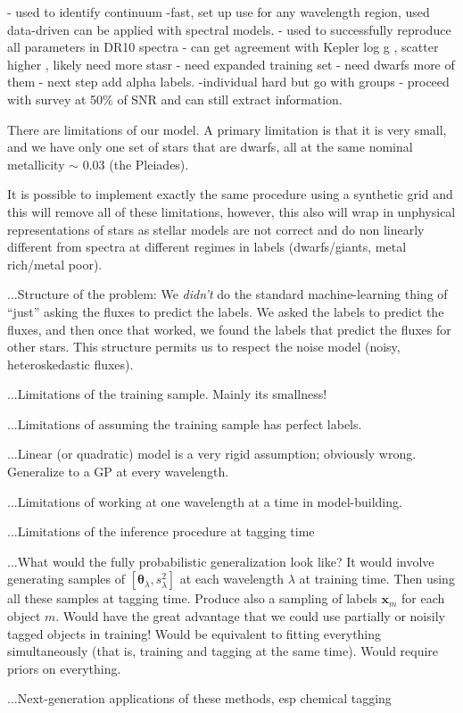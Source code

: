 \documentclass[12pt, preprint]{aastex}
\newcommand{\set}[1]{\bm{#1}}
\begin{document}
- used to identify continuum
-fast, set up use for any wavelength region, used data-driven can be applied with spectral models. 
- used to successfully reproduce all parameters in DR10 spectra
- can get agreement with Kepler log g , scatter higher , likely need more stasr
- need expanded training set - need dwarfs more of them
- next step add alpha labels. 
-individual hard but go with groups
- proceed with survey at 50\% of SNR and can still extract information.

There are limitations of our model. A primary limitation is that it is very small, and we have only one set of stars that are dwarfs, all at the same nominal metallicity $\sim$ 0.03 (the Pleiades). 

It is possible to implement exactly the same procedure using a synthetic grid and this will remove all of these limitations, however, this also will wrap in unphysical representations of stars as stellar models are not correct and do non linearly different from spectra at different regimes in labels (dwarfs/giants, metal rich/metal poor). 

...Structure of the problem:
We \emph{didn't} do the standard machine-learning thing of ``just'' asking the fluxes to predict the labels.
We asked the labels to predict the fluxes, and then once that worked, we found the labels that predict the fluxes for other stars.
This structure permits us to respect the noise model (noisy, heteroskedastic fluxes).

...Limitations of the training sample.  Mainly its smallness!

...Limitations of assuming the training sample has perfect labels.

...Linear (or quadratic) model is a very rigid assumption; obviously wrong.
Generalize to a GP at every wavelength.

...Limitations of working at one wavelength at a time in model-building.

...Limitations of the inference procedure at tagging time

...What would the fully probabilistic generalization look like?
It would involve generating samples of $[\set{\theta}_\lambda, s_\lambda^2]$ at each wavelength $\lambda$ at training time.
Then using all these samples at tagging time.
Produce also a sampling of labels $\set{x}_m$ for each object $m$.
Would have the great advantage that we could use partially or noisily tagged objects in training!
Would be equivalent to fitting everything simultaneously (that is, training and tagging at the same time).
Would require priors on everything.

...Next-generation applications of these methods, esp chemical tagging
\end{document}
